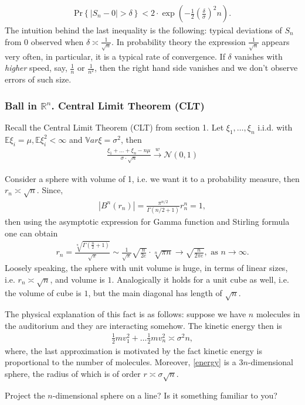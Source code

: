 \begin{eqnarray}
\text{Pr}\left\{|S_n - 0| > \delta \right\} < 2 \cdot \exp\left({-\frac 1 2 \left(\frac{\delta}{\sigma}\right)^2 n}\right).
\end{eqnarray}
The intuition behind the last inequality is the following: typical deviations of $S_n$ from $0$ observed when $\delta \asymp \frac 1{\sqrt{n}}$. In probability theory the expression $\frac 1{\sqrt{n}}$ appears very often, in particular, it is a typical rate of convergence. If $\delta$ vanishes with {\it{higher}} speed, say, $\frac 1 n$ or $\frac 1 {n^2}$, then the right hand side vanishes and we don't observe errors of such size.  
\subsubsection{Ball in $\mathbb{R}^n$. Central Limit Theorem (CLT)}
\par Recall the Central Limit Theorem (CLT) from section 1. Let $\xi_1, \dots, \xi_n$ i.i.d. with $\mathbb{E}\xi_i = \mu, \mathbb{E} \xi^2_i < \infty$ and $\mathbb{V}ar \xi = \sigma^2$, then 
\begin{eqnarray}
\frac{\xi_1 + \dots + \xi_n - n\mu}{\sigma \cdot \sqrt{n} } \xrightarrow{w} \mathcal{N}(0, 1)
\end{eqnarray}
\par Consider a sphere with volume of 1, i.e. we want it to a probability measure, then $r_n \asymp \sqrt{n}$. Since, 
\begin{eqnarray}
|B^n(r_n) | = \frac{\pi^{n/2}}{\Gamma(n/2 + 1)} r_n^n= 1, 
\end{eqnarray}
then using the asymptotic expression for Gamma function and Stirling formula one can obtain 
\begin{eqnarray}
r_n = \frac {\sqrt[n]{\Gamma\left(\frac n 2 + 1\right)}}{\sqrt{\pi}} \sim \frac 1 {\sqrt{\pi}}{\sqrt{\frac{n}{2e}}} \cdot \sqrt[n]{\pi n} \to \sqrt{\frac{n}{2\pi e}}, {\text { as } } n \to \infty.
\end{eqnarray}
Loosely speaking, the sphere with unit volume is huge, in terms of linear sizes, i.e. $r_n \asymp \sqrt{n}$, and volume is $1$. Analogically it holds for a unit cube as well, i.e. the volume of cube is $1$, but the main diagonal has length of $\sqrt{n}$.
\par The physical explanation of this fact is as follows: suppose we have $n$ molecules in the auditorium and they are interacting somehow. The kinetic energy then is  
\begin{eqnarray}\label{energy}
\frac 1 2 mv_1^2 + \dots \frac 1 2 {mv_n^2} \asymp \sigma^2 n,
\end{eqnarray}
where, the last approximation is motivated by the fact kinetic energy is proportional to the number of molecules. Moreover, \eqref{energy} is a $3n$-dimensional sphere, the radius of which  is of order $r \asymp \sigma \sqrt{n}$.
\begin{exer}
Project the $n$-dimensional sphere on a line? Is it something familiar to you? 
\end{exer}

